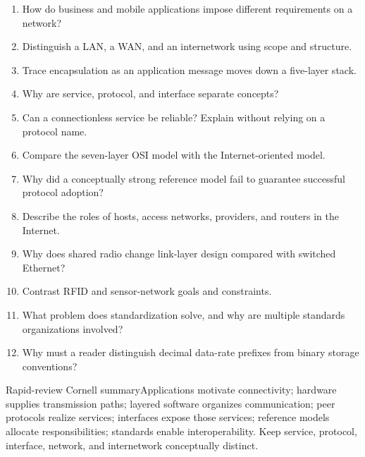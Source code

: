 \documentclass[10pt,letterpaper]{article}
\begin{document}

\begin{enumerate}
  \item How do business and mobile applications impose different requirements on a network?
  \item Distinguish a LAN, a WAN, and an internetwork using scope and structure.
  \item Trace encapsulation as an application message moves down a five-layer stack.
  \item Why are service, protocol, and interface separate concepts?
  \item Can a connectionless service be reliable? Explain without relying on a protocol name.
  \item Compare the seven-layer OSI model with the Internet-oriented model.
  \item Why did a conceptually strong reference model fail to guarantee successful protocol adoption?
  \item Describe the roles of hosts, access networks, providers, and routers in the Internet.
  \item Why does shared radio change link-layer design compared with switched Ethernet?
  \item Contrast RFID and sensor-network goals and constraints.
  \item What problem does standardization solve, and why are multiple standards organizations involved?
  \item Why must a reader distinguish decimal data-rate prefixes from binary storage conventions?
\end{enumerate}
\begin{CornellSummaryBox}{Rapid-review Cornell summary}Applications motivate connectivity; hardware supplies transmission paths; layered software organizes communication; peer protocols realize services; interfaces expose those services; reference models allocate responsibilities; standards enable interoperability. Keep service, protocol, interface, network, and internetwork conceptually distinct.\end{CornellSummaryBox}
\end{document}
